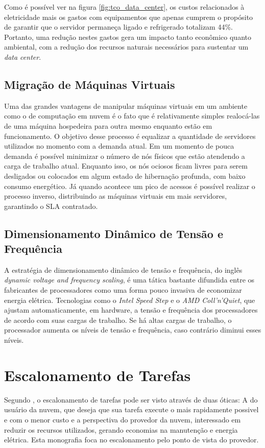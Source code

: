 Como é possível ver na figura \ref{fig:tco_data_center}, os custos relacionados
à eletricidade mais os gastos com equipamentos que apenas cumprem o propósito de
garantir que o servidor permaneça ligado e refrigerado totalizam 44\%. Portanto,
uma redução nestes gastos gera um impacto tanto econômico quanto ambiental, com
a redução dos recursos naturais necessários para sustentar um \emph{data center}.

\subsection{Migração de Máquinas Virtuais}
Uma das grandes vantagens de manipular máquinas virtuais em um ambiente como
o de computação em nuvem é o fato que é relativamente simples realocá-las de uma
máquina hospedeira para outra mesmo enquanto estão em funcionamento.
\cite{vmware:vmotion} \cite{clark:live_migration} O objetivo
desse processo é equalizar a quantidade de servidores utilizados no momento 
com a demanda atual. Em um momento de pouca demanda é possível minimizar o
número de nós físicos que estão atendendo a carga de trabalho atual. 
Enquanto isso, os nós ociosos ficam livres para serem
desligados ou colocados em algum estado de hibernação profunda, com baixo consumo
energético. \cite{beloglazov:energy_efficient_allocation_virtual_machines} Já
quando acontece um pico de acessos é possível realizar o processo inverso,
distribuindo as máquinas virtuais em mais servidores, garantindo o SLA
contratado.

\subsection{Dimensionamento Dinâmico de Tensão e Frequência}
\label{subsec:dvfs}
A estratégia de dimensionamento dinâmico de tensão e frequência, do inglês 
\emph{dynamic voltage and frequency scaling}, é uma tática 
bastante difundida entre os fabricantes de processadores como uma forma pouco
invasiva de economizar energia elétrica. Tecnologias como o \emph{Intel Speed Step}
e o \emph{AMD Coll'n'Quiet}, que ajustam automaticamente, em hardware, a tensão
e frequência dos processadores de acordo com suas cargas de trabalho. Se há
altas cargas de trabalho, o processador aumenta os níveis de tensão e
frequência, caso contrário diminui esses níveis. 
\cite{lago:escalonamento_com_prioridade_eficiente}


\section{Escalonamento de Tarefas}
\label{sec:escalonamento_tarefas}
Segundo \cite{lago:escalonamento_com_prioridade_eficiente}, o escalonamento de 
tarefas pode ser visto através de duas óticas: A do usuário da nuvem, que deseja
que sua tarefa execute o mais rapidamente possivel e com o menor custo e a 
perspectiva do provedor da nuvem, interessado em reduzir os recursos utilizados,
gerando economias na manutenção e energia elétrica. Esta monografia foca no
escalonamento pelo ponto de vista do provedor. 


